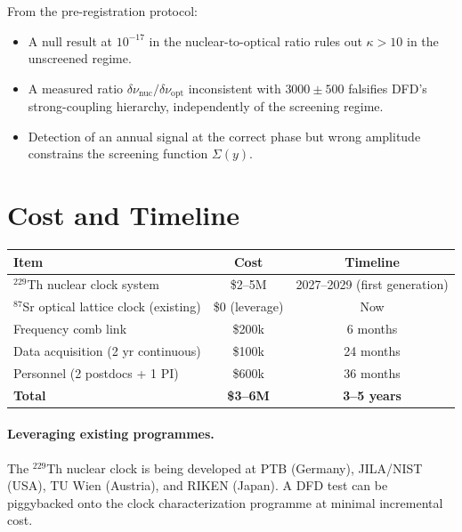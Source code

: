 \documentclass[11pt]{article}
\begin{document}
From the pre-registration protocol:
\begin{itemize}[nosep]
\item A null result at $10^{-17}$ in the nuclear-to-optical ratio
rules out $\kappa > 10$ in the unscreened regime.
\item A measured ratio $\delta\nu_{\text{nuc}}/\delta\nu_{\text{opt}}$
inconsistent with $3000 \pm 500$ falsifies DFD's strong-coupling
hierarchy, independently of the screening regime.
\item Detection of an annual signal at the correct phase but wrong
amplitude constrains the screening function $\Sigma(y)$.
\end{itemize}

\section{Cost and Timeline}
\label{sec:clock-cost}

\begin{center}
\begin{tabular}{lcc}
\toprule
\textbf{Item} & \textbf{Cost} & \textbf{Timeline} \\
\midrule
$^{229}$Th nuclear clock system & \$2--5M &
  2027--2029 (first generation) \\
$^{87}$Sr optical lattice clock (existing) & \$0 (leverage) & Now \\
Frequency comb link & \$200k & 6 months \\
Data acquisition (2 yr continuous) & \$100k & 24 months \\
Personnel (2 postdocs + 1 PI) & \$600k & 36 months \\
\midrule
\textbf{Total} & \textbf{\$3--6M} & \textbf{3--5 years} \\
\bottomrule
\end{tabular}
\end{center}

\paragraph{Leveraging existing programmes.}
The $^{229}$Th nuclear clock is being developed at PTB (Germany),
JILA/NIST (USA), TU Wien (Austria), and RIKEN (Japan).  A DFD
test can be piggybacked onto the clock characterization programme
at minimal incremental cost.
\end{document}
